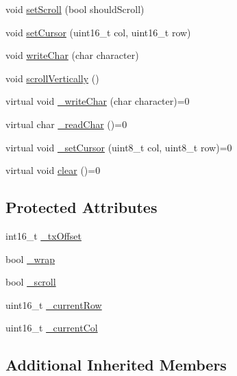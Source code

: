 \begin{DoxyCompactItemize}
void \hyperlink{classflame_1_1_display___character_adb19293aae6f7944ae498089b083ed36}{set\-Scroll} (bool should\-Scroll)
\item 
void \hyperlink{classflame_1_1_display___character_a313f5f98c38a4e73a04128cf3d94e1ba}{set\-Cursor} (uint16\-\_\-t col, uint16\-\_\-t row)
\item 
void \hyperlink{classflame_1_1_display___character_aaca15216dc5d78b1c59fcd9368a4f5b4}{write\-Char} (char character)
\item 
void \hyperlink{classflame_1_1_display___character_a5d78d106c26666eadc8b0f275bd00b2a}{scroll\-Vertically} ()
\item 
virtual void \hyperlink{classflame_1_1_display___character_a7d183c097153664ee102291ac32029c4}{\-\_\-write\-Char} (char character)=0
\item 
virtual char \hyperlink{classflame_1_1_display___character_ab68ff09ff8fa79a1b1e0c4afb7e6de95}{\-\_\-read\-Char} ()=0
\item 
virtual void \hyperlink{classflame_1_1_display___character_a2bd2f2b2b6f062f3c47f3dc417f3781d}{\-\_\-set\-Cursor} (uint8\-\_\-t col, uint8\-\_\-t row)=0
\item 
virtual void \hyperlink{classflame_1_1_display___character_ae575b7b3568f820e45029a45715a4f16}{clear} ()=0
\end{DoxyCompactItemize}
\subsection*{Protected Attributes}
\begin{DoxyCompactItemize}
\item 
int16\-\_\-t \hyperlink{classflame_1_1_display___character_a90abfe03430c90c0d50469f7e99c6c5c}{\-\_\-tx\-Offset}
\item 
bool \hyperlink{classflame_1_1_display___character_a2f51ff794dec405d8cdb42d470e9f31d}{\-\_\-wrap}
\item 
bool \hyperlink{classflame_1_1_display___character_a6216cd7f9631ec8851b2d2ed6a5c2728}{\-\_\-scroll}
\item 
uint16\-\_\-t \hyperlink{classflame_1_1_display___character_a04d2c6e9c31084e353be57fa53d97285}{\-\_\-current\-Row}
\item 
uint16\-\_\-t \hyperlink{classflame_1_1_display___character_ab6428d22cb0b06d5d1f1a1bbd71d2697}{\-\_\-current\-Col}
\end{DoxyCompactItemize}
\subsection*{Additional Inherited Members}


